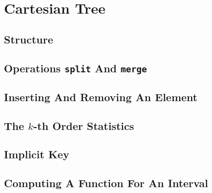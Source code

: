 \documentclass[a4paper,12pt]{article}
\begin{document}
  \section{Cartesian Tree}

    \subsection{Structure}

    \subsection{Operations \texttt{split} And \texttt{merge}}

    \subsection{Inserting And Removing An Element}

    \subsection{The $k$-th Order Statistics}

    \subsection{Implicit Key}

    \subsection{Computing A Function For An Interval}
\end{document}
